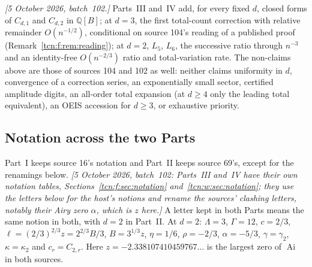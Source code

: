 \documentclass[11pt,letterpaper]{article}
\newcommand{\Ai}{\operatorname{Ai}}
\newcommand{\Q}{\mathbb Q}
\theoremstyle{remark}
\begin{document}
\emph{[5 October 2026, batch~102.]} Parts~III and~IV add, for every fixed $d$, closed forms of $C_{d,1}$ and $C_{d,2}$ in $\Q[B]$; at $d=3$, the first total-count correction with relative remainder $O(n^{-1/2})$, conditional on source 104's reading of a published proof (Remark~\ref{tcn:f:rem:reading}); at $d=2$, $L_5$, $L_6$, the successive ratio through $n^{-3}$ and an identity-free $O(n^{-2/3})$ ratio and total-variation rate. The non-claims above are those of sources 104 and 102 as well: neither claims uniformity in $d$, convergence of a correction series, an exponentially small sector, certified amplitude digits, an all-order total expansion (at $d\ge4$ only the leading total equivalent), an OEIS accession for $d\ge3$, or exhaustive priority.

\subsection{Notation across the two Parts}\label{tcn:sec:notation}
Part~I keeps source 16's notation and Part~II keeps source 69's, except for the renamings below. \emph{[5 October 2026, batch~102: Parts~III and~IV have their own notation tables, Sections~\ref{tcn:f:sec:notation} and~\ref{tcn:w:sec:notation}; they use the letters below for the host's notions and rename the sources' clashing letters, notably their Airy zero $\alpha$, which is $z$ here.]} A letter kept in both Parts means the same notion in both, with $d=2$ in Part~II. At $d=2$: $\Lambda=3$, $\Gamma=12$, $c=2/3$, $\ell=(2/3)^{2/3}z=2^{2/3}B/3$, $B=3^{1/3}z$, $\eta=1/6$, $\rho=-2/3$, $\alpha=-5/3$, $\gamma=\gamma_2$, $\kappa=\kappa_2$ and $c_r=C_{2,r}$. Here $z=-2.338107410459767\ldots$ is the largest zero of $\Ai$ in both sources.
\end{document}
